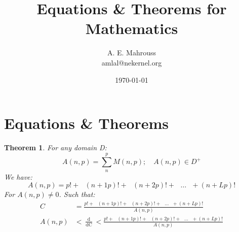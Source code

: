 \documentclass[10pt, twocolumn]{article}
\title{%
  \vspace{-1.5em}%
  \large\textbf{Equations \& Theorems for Mathematics}%
}
\author{A. E. Mahrouss\\amlal@nekernel.org}
\date{\today}
\theoremstyle{plain}
\newtheorem{theorem}{Theorem}[section]
\theoremstyle{definition}
\theoremstyle{remark}
\begin{document}
\twocolumn[{%
  \maketitle
  \vspace{-0.5em}
  \vspace{0.8em}
  \rule{\linewidth}{0.4pt}
  \vspace{1em}
}]


\section{Equations \& Theorems}

\begin{theorem}
For any domain D:
\begin{equation}
    A(n, p) = \sum_{n}^{p} M(n, p); \quad A(n, p) \in D^{+}
\end{equation}
We have:
\begin{equation}
    A(n, p) = p! + \text{ } (n+1p)! + \text{ } (n+2p)! + \text{ } \dots \text{ } + (n+Lp)! 
\end{equation}
For $A(n, p) \neq 0$. Such that:
\begin{align*}
    C &=  \frac{ p! + \text{ } (n+1p)! + \text{ } (n+2p)! + \text{ } \dots \text{ } + (n+Lp)!}{A(n, p)}\\
    A(n, p) &< \frac{\operatorname{d}}{\operatorname{dC}} < \frac{ p! + \text{ } (n+1p)! + \text{ } (n+2p)! + \text{ } \dots \text{ } + (n+Lp)!}{A(n, p)}
\end{align*}
\end{theorem}

\nocite{*}



\end{document}
